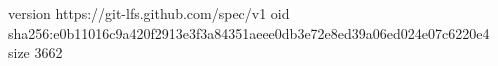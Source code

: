 version https://git-lfs.github.com/spec/v1
oid sha256:e0b11016c9a420f2913e3f3a84351aeee0db3e72e8ed39a06ed024e07c6220e4
size 3662

